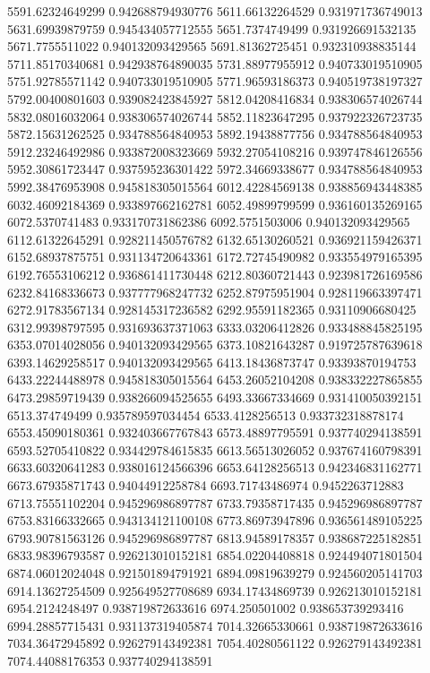 {5591.62324649299 0.942688794930776
5611.66132264529 0.931971736749013
5631.69939879759 0.945434057712555
5651.7374749499 0.931926691532135
5671.7755511022 0.940132093429565
5691.81362725451 0.932310938835144
5711.85170340681 0.942938764890035
5731.88977955912 0.940733019510905
5751.92785571142 0.940733019510905
5771.96593186373 0.940519738197327
5792.00400801603 0.939082423845927
5812.04208416834 0.938306574026744
5832.08016032064 0.938306574026744
5852.11823647295 0.937922326723735
5872.15631262525 0.934788564840953
5892.19438877756 0.934788564840953
5912.23246492986 0.933872008323669
5932.27054108216 0.939747846126556
5952.30861723447 0.937595236301422
5972.34669338677 0.934788564840953
5992.38476953908 0.945818305015564
6012.42284569138 0.938856943448385
6032.46092184369 0.933897662162781
6052.49899799599 0.936160135269165
6072.5370741483 0.933170731862386
6092.5751503006 0.940132093429565
6112.61322645291 0.928211450576782
6132.65130260521 0.936921159426371
6152.68937875751 0.931134720643361
6172.72745490982 0.933554979165395
6192.76553106212 0.936861411730448
6212.80360721443 0.923981726169586
6232.84168336673 0.937777968247732
6252.87975951904 0.928119663397471
6272.91783567134 0.928145317236582
6292.95591182365 0.93110906680425
6312.99398797595 0.931693637371063
6333.03206412826 0.933488845825195
6353.07014028056 0.940132093429565
6373.10821643287 0.919725787639618
6393.14629258517 0.940132093429565
6413.18436873747 0.93393870194753
6433.22244488978 0.945818305015564
6453.26052104208 0.938332227865855
6473.29859719439 0.938266094525655
6493.33667334669 0.931410050392151
6513.374749499 0.935789597034454
6533.4128256513 0.933732318878174
6553.45090180361 0.932403667767843
6573.48897795591 0.937740294138591
6593.52705410822 0.934429784615835
6613.56513026052 0.937674160798391
6633.60320641283 0.938016124566396
6653.64128256513 0.942346831162771
6673.67935871743 0.94044912258784
6693.71743486974 0.9452263712883
6713.75551102204 0.945296986897787
6733.79358717435 0.945296986897787
6753.83166332665 0.943134121100108
6773.86973947896 0.936561489105225
6793.90781563126 0.945296986897787
6813.94589178357 0.938687225182851
6833.98396793587 0.926213010152181
6854.02204408818 0.924494071801504
6874.06012024048 0.921501894791921
6894.09819639279 0.924560205141703
6914.13627254509 0.925649527708689
6934.17434869739 0.926213010152181
6954.2124248497 0.938719872633616
6974.250501002 0.938653739293416
6994.28857715431 0.931137319405874
7014.32665330661 0.938719872633616
7034.36472945892 0.926279143492381
7054.40280561122 0.926279143492381
7074.44088176353 0.937740294138591
}
